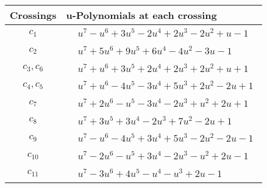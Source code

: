 \documentclass[1p]{elsarticle_modified}
\theoremstyle{definition}
\begin{document}
\begin{tabular}{m{50pt}|m{274pt}}
Crossings & \hspace{64pt}u-Polynomials at each crossing \\
\hline $$\begin{aligned}c_{1}\end{aligned}$$&$\begin{aligned}
&u^7- u^6+3 u^5-2 u^4+2 u^3-2 u^2+u-1
\end{aligned}$\\
\hline $$\begin{aligned}c_{2}\end{aligned}$$&$\begin{aligned}
&u^7+5 u^6+9 u^5+6 u^4-4 u^2-3 u-1
\end{aligned}$\\
\hline $$\begin{aligned}c_{3},c_{6}\end{aligned}$$&$\begin{aligned}
&u^7+u^6+3 u^5+2 u^4+2 u^3+2 u^2+u+1
\end{aligned}$\\
\hline $$\begin{aligned}c_{4},c_{5}\end{aligned}$$&$\begin{aligned}
&u^7+u^6-4 u^5-3 u^4+5 u^3+2 u^2-2 u+1
\end{aligned}$\\
\hline $$\begin{aligned}c_{7}\end{aligned}$$&$\begin{aligned}
&u^7+2 u^6- u^5-3 u^4-2 u^3+u^2+2 u+1
\end{aligned}$\\
\hline $$\begin{aligned}c_{8}\end{aligned}$$&$\begin{aligned}
&u^7+3 u^5+3 u^4-2 u^3+7 u^2-2 u+1
\end{aligned}$\\
\hline $$\begin{aligned}c_{9}\end{aligned}$$&$\begin{aligned}
&u^7- u^6-4 u^5+3 u^4+5 u^3-2 u^2-2 u-1
\end{aligned}$\\
\hline $$\begin{aligned}c_{10}\end{aligned}$$&$\begin{aligned}
&u^7-2 u^6- u^5+3 u^4-2 u^3- u^2+2 u-1
\end{aligned}$\\
\hline $$\begin{aligned}c_{11}\end{aligned}$$&$\begin{aligned}
&u^7-3 u^6+4 u^5- u^4- u^3+2 u-1
\end{aligned}$\\
\hline
\end{tabular}\\~\\
\end{document}
